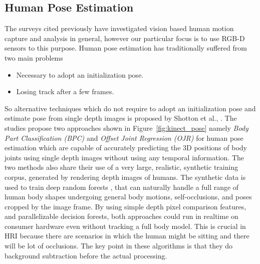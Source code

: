 \subsection{Human Pose Estimation}
\label{sec:humanpose}
The surveys \cite{Moeslund2001231}\cite{Moeslund200690}\cite{Poppe20074} cited previously have investigated vision based human motion capture and analysis in general, however our particular focus is to use RGB-D sensors to this purpose. Human pose estimation has traditionally suffered from two main problems
\begin{itemize}
\item Necessary to adopt an initialization pose.
\item Losing track after a few frames.
\end{itemize}
So alternative techniques which do not require to adopt an initialization pose and estimate pose from single depth images is proposed by Shotton et al., \cite{shotton2013real} \cite{shotton2013efficient}. The studies propose two approaches shown in Figure~\ref{fig:kinect_pose} namely \emph{Body Part Classification (BPC)} and \emph{Offset Joint Regression (OJR)} for human pose estimation which are capable of accurately predicting the 3D positions of body joints using single depth images without using any temporal information. The two methods also share their use of a very large, realistic, synthetic training corpus, generated by rendering depth images of humans. The synthetic data is used to train deep random forests \cite{breiman2001random}, that can naturally handle a full range of human body shapes undergoing general body motions, self-occlusions, and poses cropped by the image frame. By using simple depth pixel comparison features, and parallelizable decision forests, both approaches could run in realtime on consumer hardware even without tracking a full body model. This is crucial in HRI because there are scenarios in which the human might be sitting and there will be lot of occlusions. The key point in these algorithms is that they do background subtraction before the actual processing.

